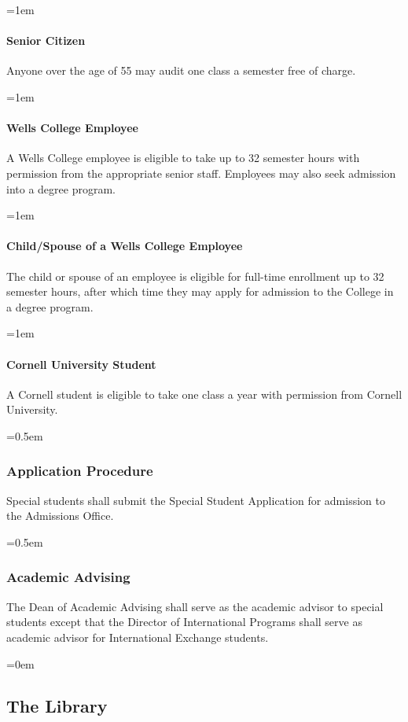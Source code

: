 \documentclass{manual}
\let\oldsubsection\subsection
\renewcommand\subsection{\leftskip=0em\oldsubsection}
\let\oldsubsubsection\subsubsection
\renewcommand\subsubsection{\leftskip=0.5em\oldsubsubsection}
\let\oldparagraph\paragraph
\renewcommand\paragraph{\leftskip=1em\oldparagraph}
\begin{document}
			\paragraph{Senior Citizen} Anyone over the age of 55 may audit one class a semester free of charge.

			\paragraph{Wells College Employee}\label{par:employeeClasses} A Wells College employee is eligible to take up to 32 semester hours with permission from the appropriate senior staff. Employees may also seek admission into a degree program.

			\paragraph{Child/Spouse of a Wells College Employee}\label{par:spouseClasses} The child or spouse of an employee is eligible for full-time enrollment up to 32 semester hours, after which time they may apply for admission to the College in a degree program.

			\paragraph{Cornell University Student} A Cornell student is eligible to take one class a year with permission from Cornell University.

		\subsubsection{Application Procedure}

			Special students shall submit the Special Student Application for admission to the Admissions Office.

		\subsubsection{Academic Advising}

			The Dean of Academic Advising shall serve as the academic advisor to special students except that the Director of International Programs shall serve as academic advisor for International Exchange students. 

	\subsection{The Library}
\end{document}
